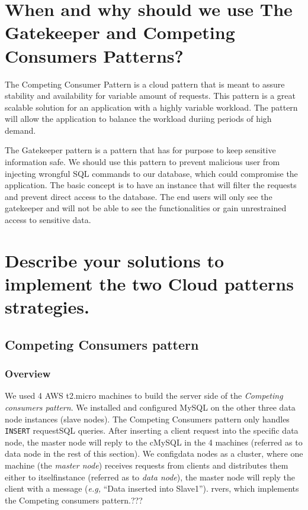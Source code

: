 \documentclass{article}
\begin{document}
  
  
  
  
  
 
\section{When and why should we use The Gatekeeper and Competing Consumers Patterns?}\label{Q2}

The Competing Consumer Pattern is a cloud pattern that is meant to assure stability and availability for variable amount of requests. This pattern is a great scalable solution for an application with a highly variable workload.  The pattern will allow the application to balance the workload duriing periods of high demand. 

The Gatekeeper pattern is a pattern that has for purpose to keep sensitive information safe. We should use this pattern to prevent malicious user from injecting wrongful SQL commands to our database, which could compromise the application. The basic concept is to have an instance that will filter the requests and prevent direct access to the database. The end users will only see the gatekeeper and will not be able to see the functionalities or gain unrestrained access to sensitive data. 

\section{Describe your solutions to implement the two Cloud patterns strategies.}\label{Q3}
\subsection{Competing Consumers pattern}
\subsubsection{Overview}
We used 4 AWS t2.micro machines to build the server side of the \emph{Competing consumers pattern}. We installed and configured MySQL on the other three data node instances (slave nodes). The Competing Consumers pattern only handles \texttt{INSERT} requestSQL queries. After inserting a client request into the specific data node, the master node will reply to the cMySQL in the 4 machines (referred as to data node in the rest of this section). We configdata nodes as a cluster, where one machine (the \emph{master node}) receives requests from clients and distributes them either to itselfinstance (referred as to \emph{data node}), the master node will reply the client with a message (\emph{e.g,} ``Data inserted into Slave1'').                                                                 rvers, which implements the Competing consumers pattern.???\\
\end{document}
